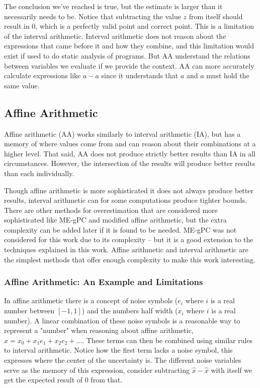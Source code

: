 The conclusion we've reached is true, but the estimate is larger than it necessarily needs to be. Notice that subtracting the value $z$ from itself should result in $0$, which is a perfectly valid point and correct point. This is a limitation of the interval arithmetic. Interval arithmetic does not reason about the expressions that came before it and how they combine, and this limitation would exist if used to do static analysis of programs. But AA understand the relations between variables we evaluate if we provide the context. AA can more accurately calculate expressions like $a - a$ since it understands that $a$ and $a$ must hold the same value. 

\subsection{Affine Arithmetic}
Affine arithmetic (AA) works similarly to interval arithmetic (IA), but has a memory of where values come from and can reason about their combinations at a higher level. That said, AA does not produce strictly better results than IA in all circumstances. However, the intersection of the results will produce better results than each individually. \cite{src:affAri}

Though affine arithmetic is more sophisticated it does not always produce better results, interval arithmetic can for some computations produce tighter bounds. There are other methods for overestimation that are considered more sophisticated like ME-gPC \cite{src:MEgPC} and modified affine arithmetic, but the extra complexity can be added later if it is found to be needed. ME-gPC was not considered for this work due to its complexity -- but it is a good extension to the techniques explained in this work. Affine arithmetic and interval arithmetic are the simplest methods that offer enough complexity to make this work interesting.

\subsubsection{Affine Arithmetic: An Example and Limitations}
In affine arithmetic there is a concept of noise symbols ($e_i$ where $i$ is a real number between $[-1, 1]$) and the numbers half width ($x_i$ where $i$ is a real number). A linear combination of these noise symbols is a reasonable way to represent a "number" when reasoning about affine arithmetic, $\hat{x} = x_0 + x_1e_1 + x_2e_2 + \dots$. These terms can then be combined using similar rules to interval arithmetic. Notice how the first term lacks a noise symbol, this expresses where the center of the uncertainty is. The different noise variables serve as the memory of this expression, consider subtracting $\hat{x} - \hat{x}$ with itself we get the expected result of 0 from that. \cite{src:affAri} 


